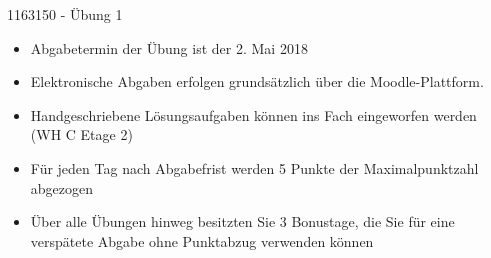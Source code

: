 \documentclass[addpoints,a4paper,ngerman,12pt,answers]{exam}
\begin{document}
\vspace*{2em}

\begin{center}
	{\Large 1163150 - Übung 1}
\end{center}

\vspace*{3em}


\vspace*{2em}


\vspace*{2em}

\begin{itemize}
\item Abgabetermin der Übung ist der 2. Mai 2018
\item Elektronische Abgaben erfolgen grundsätzlich über die Moodle-Plattform.
\item Handgeschriebene Lösungsaufgaben können ins Fach eingeworfen werden (WH C Etage 2)
\item Für jeden Tag nach Abgabefrist werden 5 Punkte der Maximalpunktzahl abgezogen
\item Über alle Übungen hinweg besitzten Sie 3 Bonustage, die Sie für eine verspätete Abgabe ohne Punktabzug verwenden können
\end{itemize}

\vspace*{25em}

\begin{center}
	\gradetable[h][questions]
\end{center}

\clearpage
\end{document}
